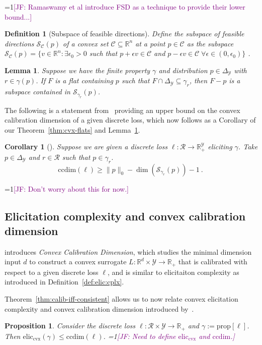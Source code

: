 \documentclass{article}
\newcommand{\Comments}{1}
\newcommand{\mynote}[2]{\ifnum\Comments=1\textcolor{#1}{#2}\fi}
\newcommand{\jessie}[1]{\mynote{purple}{[JF: #1]}}
\newcommand{\reals}{\mathbb{R}}
\newcommand{\simplex}{\Delta_\Y}
\newcommand{\prop}[1]{\mathrm{prop}[#1]}
\newcommand{\eliccvx}{\mathrm{elic}_\mathrm{cvx}}
\newcommand{\ccdim}{\mathrm{ccdim}}
\newcommand{\C}{\mathcal{C}}
\newcommand{\R}{\mathcal{R}}
\renewcommand{\S}{\mathcal{S}}
\newcommand{\Y}{\mathcal{Y}}
\newtheorem{lemma}{Lemma}
\newtheorem{proposition}{Proposition}
\newtheorem{corollary}{Corollary}
\newtheorem{definition}{Definition}
\begin{document}
\jessie{Ramaswamy et al introduce FSD as a technique to provide their lower bound...}
\begin{definition}[Subspace of feasible directions]
	Define the \emph{subspace of feasible directions} $\S_\C(p)$ of a convex set $\C \subseteq \reals^n$ at a point $p \in \C$ as the subspace $\S_\C(p) = \{ v \in \reals^n : \exists \epsilon_0 > 0 $ such that $p + \epsilon v \in \C$ and $p - \epsilon v \in \C \; \forall \epsilon \in (0,\epsilon_0) \}$ .
\end{definition}

\begin{lemma}\label{lem:feas-sub-is-a-flat}
	Suppose we have the finite property $\gamma$ and distribution $p \in \simplex$ with $r \in \gamma(p)$.
	If $F$ is a flat containing $p$ such that $F \cap \simplex \subseteq \gamma_r$, then $F - p$ is a subspace contained in $\S_{\gamma_r}(p)$.
\end{lemma}


The following is a statement from~\cite{ramaswamy2016convex} providing an upper bound on the convex calibration dimension of a given discrete loss, which now follows as a Corollary of our Theorem~\ref{thm:cvx-flats} and Lemma~\ref{lem:feas-sub-is-a-flat}.

\begin{corollary}[\cite{ramaswamy2016convex}]
	Suppose we are given a discrete loss $\ell:\R \to \reals^\Y_+$ eliciting $\gamma$.
	Take $p \in \simplex$ and $r \in \R$ such that $p \in \gamma_r$.
	\begin{equation}
	\ccdim(\ell) \geq \|p\|_0 - \dim(\S_{\gamma_r}(p)) - 1~.~
	\end{equation}
\end{corollary}



\jessie{Don't worry about this for now.}
\subsection{Elicitation complexity and convex calibration dimension}
\cite{ramaswamy2016convex} introduces \emph{Convex Calibration Dimension}, which studies the minimal dimension input $d$ to construct a convex surrogate $L : \reals^d \times \Y \to \reals_+$ that is calibrated with respect to a given discrete loss $\ell$, and is similar to elicitaiton complexity as introduced in Definition~\ref{def:elic:cplx}.

Theorem~\ref{thm:calib-iff-consistent} allows us to now relate convex elicitation complexity and convex calibration dimension introduced by~\cite[Definition 10]{ramaswamy2016convex}.
\begin{proposition}
	Consider the discrete loss $\ell : \R \times \Y \to \reals_+$ and $\gamma:= \prop{\ell}$.
	Then $\eliccvx(\gamma) \leq \ccdim(\ell)$.
	\jessie{Need to define $\eliccvx$ and $\ccdim$.}
\end{proposition}
\end{document}
